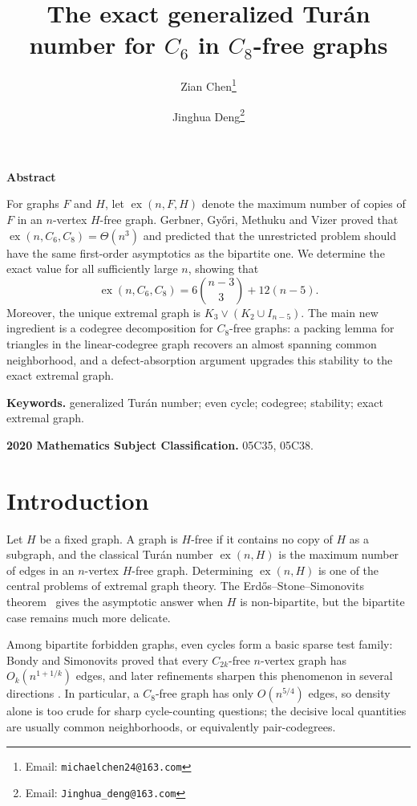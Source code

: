\documentclass[11pt,letterpaper]{article}
\title{The exact generalized Tur\'an number for \(C_6\) in \(C_8\)-free graphs}
\author[1]{Zian Chen\thanks{Email: \texttt{michaelchen24@163.com}}}
\author[1]{Jinghua Deng\thanks{Email: \texttt{Jinghua\_deng@163.com}}}
\affil[1]{Center for Discrete Mathematics,
            Fuzhou University, Fujian, 350003, China}
\date{}
\newcommand{\ex}{\operatorname{ex}}
\begin{document}
\maketitle

\begin{center}
  \begin{minipage}{0.88\textwidth}
    \begin{center}
      \textbf{Abstract}
    \end{center}
    For graphs $F$ and $H$, let $\ex(n,F,H)$ denote the maximum number of copies of $F$ in an $n$-vertex $H$-free graph. Gerbner, Gy\H{o}ri, Methuku and Vizer proved that $\ex(n,C_6,C_8)=\Theta(n^3)$ and predicted that the unrestricted problem should have the same first-order asymptotics as the bipartite one. We determine the exact value for all sufficiently large $n$, showing that
\[
  \ex(n,C_6,C_8)=6\binom{n-3}{3}+12(n-5).
\]
Moreover, the unique extremal graph is $K_3\vee (K_2\cup I_{n-5})$. The main new ingredient is a codegree decomposition for $C_8$-free graphs: a packing lemma for triangles in the linear-codegree graph recovers an almost spanning common neighborhood, and a defect-absorption argument upgrades this stability to the exact extremal graph.
  \end{minipage}
\end{center}

\medskip
\noindent\textbf{Keywords.} generalized Tur\'an number; even cycle; codegree; stability; exact extremal graph.

\noindent\textbf{2020 Mathematics Subject Classification.} 05C35, 05C38.

\section{Introduction}

Let $H$ be a fixed graph. A graph is $H$-free if it contains no copy of $H$ as a subgraph, and the classical Tur\'an number $\ex(n,H)$ is the maximum number of edges in an $n$-vertex $H$-free graph. Determining $\ex(n,H)$ is one of the central problems of extremal graph theory. The Erd\H{o}s--Stone--Simonovits theorem~\cite{ErdosStone1946,ErdosSimonovits1966} gives the asymptotic answer when $H$ is non-bipartite, but the bipartite case remains much more delicate. 

Among bipartite forbidden graphs, even cycles form a basic sparse test family: Bondy and Simonovits proved that every $C_{2k}$-free $n$-vertex graph has $O_k(n^{1+1/k})$ edges, and later refinements sharpen this phenomenon in several directions \cite{BondySimonovits1974,BukhJiang2017}. In particular, a $C_8$-free graph has only $O(n^{5/4})$ edges, so density alone is too crude for sharp cycle-counting questions; the decisive local quantities are usually common neighborhoods, or equivalently pair-codegrees.
\end{document}

